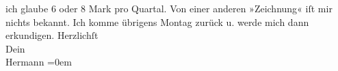 \begin{ledgroupsized}[t]{13cm}
               ich glaube 6 oder 8 Mark pro Quartal. Von einer anderen »Zeichnung« iſt mir nichts
               bekannt. Ich komme übrigens Montag zurück u. werde mich dann erkundigen.\pend
           \pstart
           Herzlichſt{\\[\baselineskip]}Dein{\\[\baselineskip]}\spacefill\mbox{Hermann}\pend
           \leftskip=0em{}
         
         \endnumbering{}\end{ledgroupsized}  \newcommand{\dateiname}{L01291}\newcommand{\titel}{Hermann Bahr an Arthur Schnitzler, 21. 5. 1903}\newcommand{\editorInnen}{ Kurt Ifkovits,  Martin Anton Müller}
      